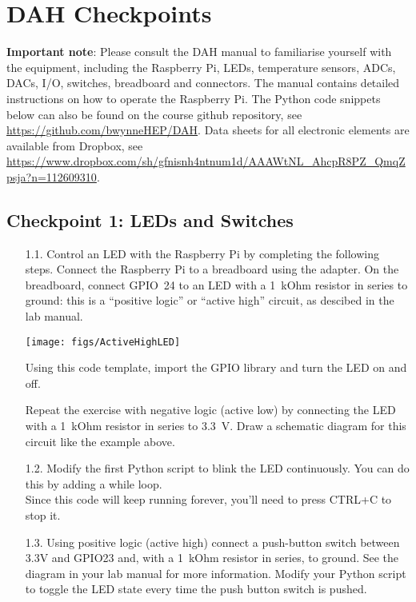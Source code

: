\chapter{DAH Checkpoints}
\label{sec:checkpoints}
\vspace*{-0.99cm}
{\bf Important note}: Please consult the DAH manual to familiarise yourself with the equipment, including the Raspberry Pi, LEDs, temperature sensors, ADCs, DACs, I/O, switches, breadboard and connectors.
The manual contains detailed instructions on how to operate the Raspberry Pi.
The Python code snippets below can also be found on the course github repository, see \url{https://github.com/bwynneHEP/DAH}.
Data sheets for all electronic elements are available from Dropbox, see \url{https://www.dropbox.com/sh/gfnisnh4ntnum1d/AAAWtNL_AhcpR8PZ_QmqZpsja?n=112609310}.  

\section{Checkpoint 1: LEDs and Switches}

\begin{enumerate}
\item [1.1.] Control an LED with the Raspberry Pi by completing the following steps.
Connect the Raspberry Pi to a breadboard using the adapter.
On the breadboard, connect GPIO~24 to an LED with a 1~kOhm resistor in series to ground: this is a ``positive logic'' or ``active high'' circuit, as descibed in the lab manual.

\vspace*{-3mm}
\begin{center}                                        
{\texttt{[image: figs/ActiveHighLED]}}
\end{center}

\newpage
Using this code template, import the GPIO library and turn the LED on and off.


Repeat the exercise with negative logic (active low) by connecting the LED with a 1~kOhm resistor in series to 3.3~V.
Draw a schematic diagram for this circuit like the example above.
 

\item [1.2.] Modify the first Python script to blink the LED continuously.
You can do this by adding a while loop. \\



Since this code will keep running forever, you'll need to press CTRL+C to stop it.
 

\item [1.3.] Using positive logic (active high) connect a push-button switch between 3.3V and GPIO23 and, with a 1~kOhm resistor in series, to ground.
See the diagram in your lab manual for more information.
Modify your Python script to toggle the LED state every time the push button switch is pushed. \\



\end{enumerate}

